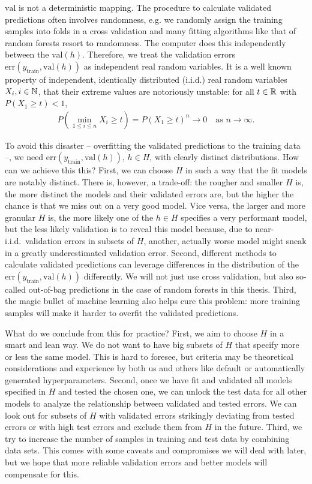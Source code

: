 $\text{val}$ is not a deterministic mapping. The procedure to calculate validated predictions often 
involves randomness, e.g. we randomly assign the training samples into folds in a cross validation 
and many fitting algorithms like that of random forests resort to randomness. The computer does this 
independently between the $\text{val}(h)$. Therefore, we treat the validation errors
$\text{err}(y_\text{train}, \text{val}(h))$ as independent 
real random variables. It is a well known property of independent, identically distributed (i.i.d.) 
real random variables $X_i, i \in \mathbb{N}$, that their extreme values are notoriously unstable: for all 
$t \in \mathbb{R}$ with $P(X_1 \geq t) < 1$, 
\begin{align}
    P\left( \min_{1 \leq i \leq n} X_i \geq t \right) = P(X_1 \geq t)^n \to 0 \quad
    \text{as } n \to \infty.
\end{align}

To avoid this disaster -- overfitting the validated predictions to the training 
data --, we need $\text{err}(y_\text{train}, \text{val}(h))$, $h \in H$, with clearly distinct 
distributions. 
How can we achieve this this? First, we can choose $H$ in such a way that the fit models are 
notably distinct. There is, however, a trade-off: the rougher and smaller $H$ is, the more distinct 
the models and their validated errors are, but the higher the chance is that we miss out on a very good 
model. Vice versa, the larger and more granular $H$ is, the more likely one of the $h \in H$ 
specifies a very performant model, but the less likely validation is to reveal this model because,
due to near-i.i.d.\ validation errors in subsets of $H$, another, actually worse model might sneak 
in a greatly underestimated validation error. Second, different methods to calculate validated
predictions can leverage differences in the distribution of the 
$\text{err}(y_\text{train}, \text{val}(h))$ differently. We will not just use cross validation, but 
also so-called out-of-bag predictions in the case of random forests in this thesis. Third, the 
magic bullet of machine learning also helps cure this problem: more training samples will make it 
harder to overfit the validated predictions.

What do we conclude from this for practice? First, we aim to choose $H$ in a smart and lean way. 
We do not want to have big subsets of $H$ that specify more or less the same model. This is hard 
to foresee, but criteria may be theoretical considerations and experience by both us and others 
like default or automatically generated hyperparameters. Second, once we have fit and validated 
all models specified in $H$ and tested the chosen one, we can unlock the test data for all other 
models to analyze the relationship between validated and tested errors. We can look out for subsets 
of $H$ with validated errors strikingly deviating from tested errors or with high test errors and 
exclude them from $H$ in the future. Third, we try to increase the number of samples in training 
and test data by combining data sets. This comes with some caveats and compromises we will deal with 
later, but we hope that more reliable validation errors and better models will compensate for this.

